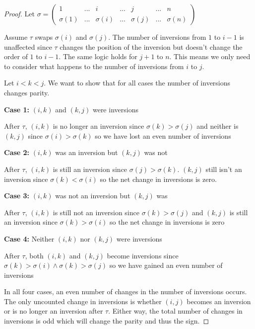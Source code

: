 \begin{proof}
    Let $\sigma=\begin{pmatrix}
    1 & ... & i & ... & j & ... & n\\
    \sigma(1) & ... & \sigma(i) & ... & \sigma(j) & ... & \sigma(n)
\end{pmatrix}$

Assume $\tau$ swaps $\sigma(i)$ and $\sigma(j)$. The number of inversions from $1$ to $i-1$ is unaffected since $\tau$ changes the position of the inversion but doesn't change the order of $1$ to $i-1$. The same logic holds for $j+1$ to $n$. This means we only need to consider what happens to the number of inversions from $i$ to $j$.

Let $i<k<j$. We want to show that for all cases the number of inversions changes parity.


\textbf{Case 1:} $(i,k)$ and $(k,j)$ were inversions

After $\tau$, $(i,k)$ is no longer an inversion since $\sigma(k)>\sigma(j)$ and neither is $(k,j)$ since $\sigma(i)>\sigma(k)$ so we have lost an even number of inversions

\textbf{Case 2:} $(i,k)$ was an inversion but $(k,j)$ was not

After $\tau$, $(i,k)$ is still an inversion since $\sigma(j)>\sigma(k)$. $(k,j)$ still isn't an inversion since $\sigma(k)<\sigma(i)$ so the net change in inversions is zero.

\textbf{Case 3:} $(i,k)$ was not an inversion but $(k,j)$ was

After $\tau$, $(i,k)$ is still not an inversion since $\sigma(k)>\sigma(j)$ and $(k,j)$ is still an inversion since $\sigma(k)>\sigma(i)$ so the net change in inversions is zero

\textbf{Case 4:} Neither $(i,k)$ nor $(k,j)$ were inversions

After $\tau$, both $(i,k)$ and $(k,j)$ become inversions since $\sigma(k)>\sigma(i)\wedge\sigma(k)>\sigma(j)$ so we have gained an even number of inversions

In all four cases, an even number of changes in the number of inversions occurs. The only uncounted change in inversions is whether $(i,j)$ becomes an inversion or is no longer an inversion after $\tau$. Either way, the total number of changes in inversions is odd which will change the parity and thus the sign.
\end{proof}


